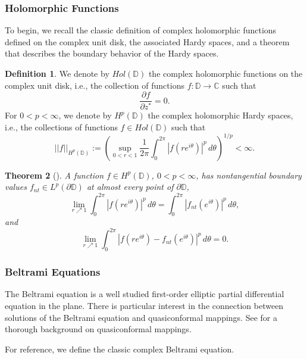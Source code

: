 \documentclass[12pt,reqno]{amsart}
\newtheorem{theorem}{Theorem}[section]
\theoremstyle{definition}
\newtheorem{deff}[theorem]{Definition}
\theoremstyle{remark}
\newcommand{\C}{\mathbb C}
\newcommand{\p}{\partial}
\newcommand{\disk}{\mathbb{D}}
\begin{document}
        \subsubsection{Holomorphic Functions}

        To begin, we recall the classic definition of complex holomorphic functions defined on the complex unit disk, the associated Hardy spaces, and a theorem that describes the boundary behavior of the Hardy spaces.

        \begin{deff}
            We denote by $Hol(\disk)$ the complex holomorphic functions on the complex unit disk, i.e., the collection of functions $f:\disk\to\C$ such that
            \[
                \frac{\p f}{\p z^*}  = 0.
            \]      
            For $0 < p < \infty$, we denote by $H^p(\disk)$ the complex holomorphic Hardy spaces, i.e., the collections of functions $f \in Hol(\disk)$ such that
            \[
                ||f||_{H^p(\disk)}:= \left( \sup_{0 < r < 1} \frac{1}{2\pi}\int_0^{2\pi} |f(re^{i\theta})|^p\,d\theta \right)^{1/p} < \infty.
            \]      
        \end{deff}


        \begin{theorem}[\cite{Duren, Koosis, Rep, RudinCR, BAF}]\label{bvcon}
        A function $f \in H^p(\disk)$, $0 < p < \infty$, has nontangential boundary values $f_{nt} \in L^p(\partial \disk)$ at almost every point of $\p \disk$, 
        \[
            \lim_{r\nearrow 1} \int_0^{2\pi} |f(re^{i\theta})|^p \, d\theta = \int_0^{2\pi} |f_{nt}(e^{i\theta})|^p \,d\theta,
        \]
        and
        \[
            \lim_{r\nearrow 1} \int_0^{2\pi} |f(re^{i\theta})- f_{nt}(e^{i\theta})|^p \, d\theta = 0.
        \]
        \end{theorem}

        \subsubsection{Beltrami Equations}

        The Beltrami equation is a well studied first-order elliptic partial differential equation in the plane. There is particular interest in the connection between solutions of the Beltrami equation and quasiconformal mappings. See \cite{ellipquasi} for a thorough background on quasiconformal mappings. 
        
        For reference, we define the classic complex Beltrami equation.
        
\end{document}
